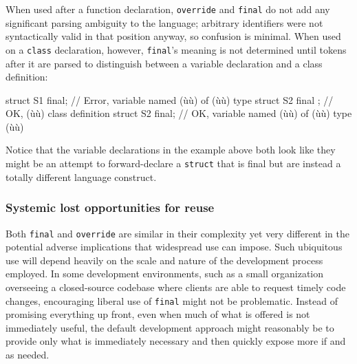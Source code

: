 {When used after a function declaration, \lstinline!override! and
\lstinline!final! do not add any significant parsing ambiguity to the
language; arbitrary identifiers were not syntactically valid in that
position anyway, so confusion is minimal. When used on a \lstinline!class!
declaration, however, \lstinline!final!'s meaning is not determined until
tokens after it are parsed to distinguish between a variable declaration
and a class definition:

\begin{emcppslisting}
struct S1 final;      // Error, variable named (ù{}ù) of (ù{}ù) type
struct S2 final { };  // OK, (ù{}ù) class definition
struct S2 final;      // OK, variable named (ù{}ù) of (ù{}ù) type (ù{}ù)
\end{emcppslisting}
    

\noindent Notice that the variable declarations in the example above both look
like they might be an attempt to forward-declare a \lstinline!struct! that
is final but are instead a totally different language construct.

\subsubsection[Systemic lost opportunities for reuse]{Systemic lost opportunities for reuse}\label{systemic-lost-opportunities-for-reuse}

Both \lstinline!final! and \lstinline!override! are similar in their
complexity yet very different in the potential adverse implications that
widespread use can impose. Such ubiquitous use will depend heavily on
the scale and nature of the development process employed. In some
development environments, such as a small organization overseeing a
closed-source codebase where clients are able to request timely code
changes, encouraging liberal use of \lstinline!final! might not be
problematic. Instead of promising everything up front, even when much of
what is offered is not immediately useful, the default development
approach might reasonably be to provide only what is immediately
necessary and then quickly expose more if and as needed.

}
